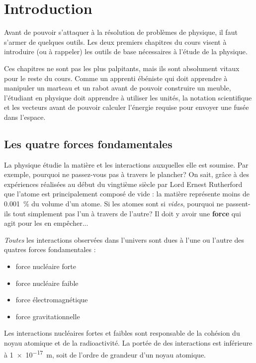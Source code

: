 \chapter{Introduction}

Avant de pouvoir s'attaquer à la résolution de problèmes de physique, il faut
s'armer de quelques outils.  Les deux premiers chapitres du cours visent à
introduire (ou à rappeler) les outils de base nécessaires à l'étude de la
physique.

Ces chapitres ne sont pas les plus palpitants, mais ils sont absolument vitaux
pour le reste du cours.  Comme un apprenti ébéniste qui doit apprendre à
manipuler un marteau et un rabot avant de pouvoir construire un meuble,
l'étudiant en physique doit apprendre à utiliser les unités, la notation
scientifique et les vecteurs avant de pouvoir calculer l'énergie requise pour
envoyer une fusée dans l'espace.


\section{Les quatre forces fondamentales}

La physique étudie la matière et les interactions auxquelles elle est soumise.
Par exemple, pourquoi ne passez-vous pas à travers le plancher?  On sait, grâce
à des expériences réalisées au début du vingtième siècle par Lord Ernest
Rutherford  que l'atome est principalement composé de vide : la matière
représente moins de \SI{0.001}{\percent} du volume d'un atome.  Si les atomes
sont si \emph{vides}, pourquoi ne passent-ils tout simplement pas l'un à
travers de l'autre?  Il doit y avoir une \textbf{force} qui agit pour les en
empêcher...

\emph{Toutes} les interactions observées dans l'univers sont dues à l'une ou
l'autre des quatres forces fondamentales :

\begin{itemize}
  \item force nucléaire forte
  \item force nucléaire faible
  \item force électromagnétique
  \item force gravitationnelle
\end{itemize}

Les interactions nucléaires fortes et faibles sont responsable de la cohésion
du noyau atomique et de la radioactivité.  La portée de des interactions est
inférieure à \SI{1e-17}{\meter}, soit de l'ordre de grandeur d'un noyau
atomique.

